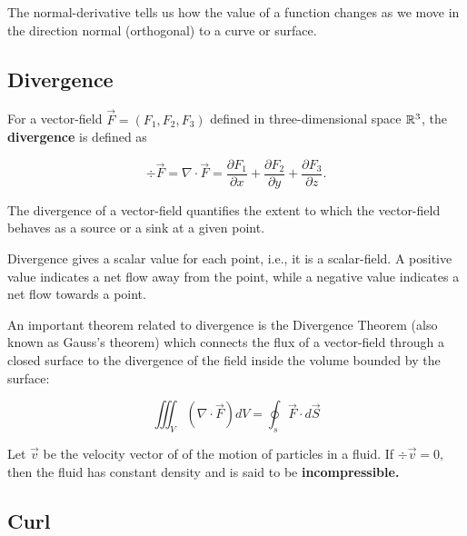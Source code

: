 \documentclass{article}
\begin{document}
\begin{remark}
The \@{normal-derivative} tells us how the value of a \@{function} changes as we move in the \@{direction} normal (\@{orthogonal}) to a curve or surface.
\end{remark}

\subsection{Divergence}

\begin{definition}[Divergence]
For a \@{vector-field} $\vec{F} = (F_1, F_2, F_3)$ defined in three-dimensional space $\mathbb{R}^3$, the \textbf{divergence} is defined as

\[ \div \vec{F} = \nabla \cdot \vec{F} = \frac{\partial F_1}{\partial x} + \frac{\partial F_2}{\partial y} + \frac{\partial F_3}{\partial z}. \]
\end{definition}

\begin{remark}
The \@{divergence} of a \@{vector-field} quantifies the extent to which the \@{vector-field} behaves as a source or a sink at a given \@{point}.

\@{Divergence} gives a \@{scalar} \@{value} for each \@{point}, i.e., it is a \@{scalar-field}. A positive value indicates a net flow away from the point, while a negative value indicates a net flow towards a point.
\end{remark}

\begin{theorem}
An important theorem related to \@{divergence} is the Divergence Theorem (also known as Gauss's theorem) which connects the flux of a \@{vector-field} through a closed surface to the divergence of the field inside the volume bounded by the surface:

\[ \iiint_V (\nabla \cdot \vec{F}) dV = \oint_s \vec{F} \cdot d\vec{S} \]
\end{theorem}

\begin{definition}[incompressible]
Let $\vec{v}$ be the velocity \@{vector} of of the motion of particles in a fluid. If $\div{\vec{v}} = 0,$ then the fluid has constant density and is said to be \textbf{incompressible.}
\end{definition}

\subsection{Curl}
\end{document}
